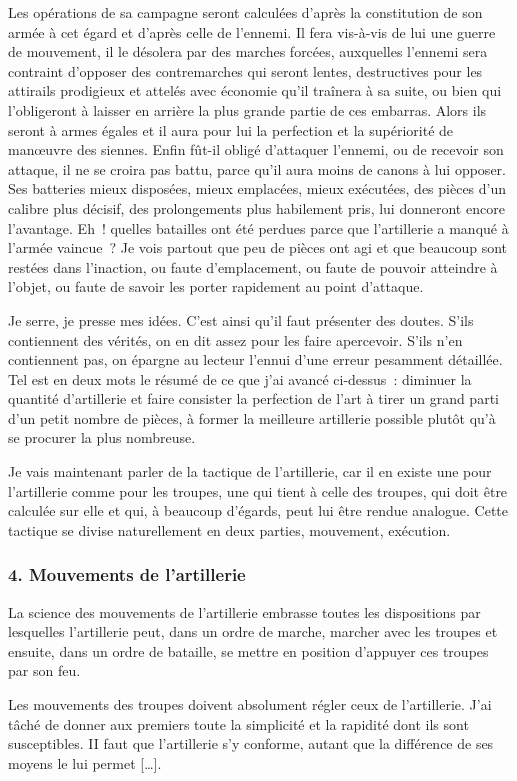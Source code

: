\documentclass[french,twoside]{book} %
\begin{document}
Les opérations de sa campagne seront calculées d’après la constitution de son armée à cet égard et d’après celle de l’ennemi. Il fera vis-à-vis de lui une guerre de mouvement, il le désolera par des marches forcées, auxquelles l’ennemi sera contraint d’opposer des contremarches qui seront lentes, destructives pour les attirails prodigieux et attelés avec économie qu’il traînera à sa suite, ou bien qui l’obligeront à laisser en arrière la plus grande partie de ces embarras. Alors ils seront à armes égales et il aura pour lui la perfection et la supériorité de manœuvre des siennes. Enfin fût-il obligé d’attaquer l’ennemi, ou de recevoir son attaque, il ne se croira pas battu, parce qu’il aura moins de canons à lui opposer. Ses batteries mieux disposées, mieux emplacées, mieux exécutées, des pièces d’un calibre plus décisif, des prolongements plus habilement pris, lui donneront encore l’avantage. Eh ! quelles batailles ont été perdues parce que l’artillerie a manqué à l’armée vaincue ? Je vois partout que peu de pièces ont agi et que beaucoup sont restées dans l’inaction, ou faute d’emplacement, ou faute de pouvoir atteindre à l’objet, ou faute de savoir les porter rapidement au point d’attaque.\par
Je serre, je presse mes idées. C’est ainsi qu’il faut présenter des doutes. S’ils contiennent des vérités, on en dit assez pour les faire apercevoir. S’ils n’en contiennent pas, on épargne au lecteur l’ennui d’une erreur pesamment détaillée. Tel est en deux mots le résumé de ce que j’ai avancé ci-dessus : diminuer la quantité d’artillerie et faire consister la perfection de l’art à tirer un grand parti d’un petit nombre de pièces, à former la meilleure artillerie possible plutôt qu’à se procurer la plus nombreuse.\par
Je vais maintenant parler de la tactique de l’artillerie, car il en existe une pour l’artillerie comme pour les troupes, une qui tient à celle des troupes, qui doit être calculée sur elle et qui, à beaucoup d’égards, peut lui être rendue analogue. Cette tactique se divise naturellement en deux parties, mouvement, exécution.
\subsubsection[{4. Mouvements de l’artillerie}]{4. Mouvements de l’artillerie}
\noindent La science des mouvements de l’artillerie embrasse toutes les dispositions par lesquelles l’artillerie peut, dans un ordre de marche, marcher avec les troupes et ensuite, dans un ordre de bataille, se mettre en position d’appuyer ces troupes par son feu.\par
Les mouvements des troupes doivent absolument régler ceux de l’artillerie. J’ai tâché de donner aux premiers toute la simplicité et la rapidité dont ils sont susceptibles. II faut que l’artillerie s’y conforme, autant que la différence de ses moyens le lui permet […].
\end{document}
